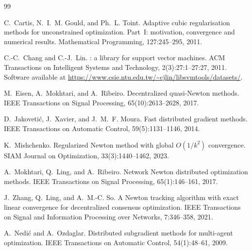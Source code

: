 \documentclass[review,onefignum,onetabnum]{siamart171218}
\begin{document}
	
	\begin{thebibliography}{99}
		
		C.~Cartis, N.~I.~M. Gould, and Ph.~L. Toint.
		\newblock Adaptive cubic regularisation methods for unconstrained optimization. Part~I: motivation, convergence and numerical results.
		\newblock Mathematical Programming, 127:245--295, 2011.
		
		C.-C.~Chang and C.-J.~Lin.
		: a library for support vector machines.
		\newblock ACM Transactions on Intelligent Systems and Technology, 2(3):27:1--27:27, 2011.
		\newblock Software available at \url{https://www.csie.ntu.edu.tw/~cjlin/libsvmtools/datasets/}.
		
		M.~Eisen, A.~Mokhtari, and A.~Ribeiro.
		\newblock Decentralized quasi-{N}ewton methods.
		\newblock IEEE Transactions on Signal Processing, 65(10):2613--2628, 2017.
		
		D.~Jakoveti{\'c}, J.~Xavier, and J.~M.~F. Moura.
		\newblock Fast distributed gradient methods.
		\newblock IEEE Transactions on Automatic Control, 59(5):1131--1146, 2014.
		
		K.~Mishchenko.
		\newblock Regularized {N}ewton method with global $O(1/k^2)$ convergence.
		\newblock SIAM Journal on Optimization, 33(3):1440--1462, 2023.
		
		A.~Mokhtari, Q.~Ling, and A.~Ribeiro.
		\newblock Network {N}ewton distributed optimization methods.
		\newblock IEEE Transactions on Signal Processing, 65(1):146--161, 2017.
		
		J.~Zhang, Q.~Ling, and A.~M.-C. So.
		\newblock A {N}ewton tracking algorithm with exact linear convergence for decentralized consensus optimization.
		\newblock IEEE Transactions on Signal and Information Processing over Networks, 7:346--358, 2021.
		
		A.~Nedi{\'c} and A.~Ozdaglar.
		\newblock Distributed subgradient methods for multi-agent optimization.
		\newblock IEEE Transactions on Automatic Control, 54(1):48--61, 2009.
		

\end{thebibliography}
\end{document}
